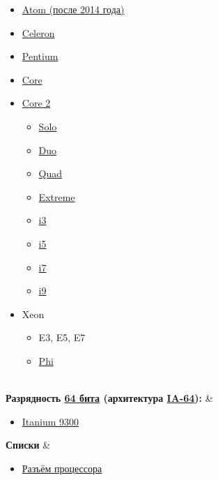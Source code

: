 \documentclass[a4paper,11pt]{article}
\begin{document}
\begin{tabular}
\begin{tabular}
\begin{tabular}
\begin{itemize}
	\item \href{https://ru.wikipedia.org/wiki/Intel_Atom}{Atom (после 2014 года)}
	\item \href{https://ru.wikipedia.org/wiki/Celeron}{Celeron}
	\item \href{https://ru.wikipedia.org/wiki/Pentium}{Pentium}
	\item \href{https://ru.wikipedia.org/wiki/Core}{Core}
	\item \href{https://ru.wikipedia.org/wiki/Core_2}{Core 2}
\begin{itemize}
	\item \href{https://ru.wikipedia.org/wiki/Core_2_Solo}{Solo}
	\item \href{https://ru.wikipedia.org/wiki/Core_2_Duo}{Duo}
	\item \href{https://ru.wikipedia.org/wiki/Core_2_Quad}{Quad}
	\item \href{https://ru.wikipedia.org/wiki/Core_2_Extreme}{Extreme}
	\item \href{https://ru.wikipedia.org/wiki/Core_i3}{i3}
	\item \href{https://ru.wikipedia.org/wiki/Core_i5}{i5}
	\item \href{https://ru.wikipedia.org/wiki/Core_i7}{i7}
	\item \href{https://ru.wikipedia.org/wiki/Core_i9}{i9}
\end{itemize}
	\item Xeon
\begin{itemize}
	\item E3, E5, E7
	\item \href{https://ru.wikipedia.org/wiki/Xeon_Phi}{Phi}
\end{itemize}
\end{itemize} \\ 
\textbf{Разрядность \href{https://ru.wikipedia.org/wiki/64_%D0%B1%D0%B8%D1%82%D0%B0}{64 бита} (архитектура \href{https://ru.wikipedia.org/wiki/IA-64}{IA-64}):} & 
\begin{itemize}
	\item \href{https://ru.wikipedia.org/wiki/Tukwila_(%D0%BF%D1%80%D0%BE%D1%86%D0%B5%D1%81%D1%81%D0%BE%D1%80)}{Itanium 9300}
\end{itemize}
\end{tabular}\textbf{Списки} & 
\begin{itemize}
	\item \href{https://ru.wikipedia.org/wiki/%D0%A0%D0%B0%D0%B7%D1%8A%D1%91%D0%BC_%D0%BF%D1%80%D0%BE%D1%86%D0%B5%D1%81%D1%81%D0%BE%D1%80%D0%B0}{Разъём процессора}

\end{itemize}
\end{tabular}
\end{tabular}
\end{document}
